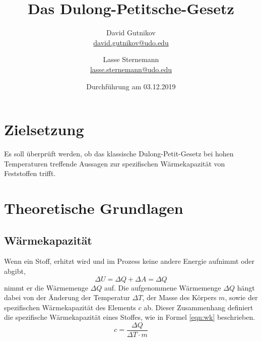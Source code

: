 \documentclass[titlepage = firstcover]{scrartcl}
\title{Das Dulong-Petitsche-Gesetz}
\author{
  David Gutnikov\\
  \href{mailto:david.gutnikov@udo.edu}{david.gutnikov@udo.edu}
 \and 
  Lasse Sternemann\\
  \href{mailto:lasse.sternemann@udo.edu}{lasse.sternemann@udo.edu}
}
\date{Durchführung am 03.12.2019}
\begin{document}
    \maketitle
    \tableofcontents
    \newpage

    \section{Zielsetzung}
        Es soll überprüft werden, ob das klassische Dulong-Petit-Gesetz bei hohen Temperaturen treffende Aussagen zur spezifischen
        Wärmekapazität von Feststoffen trifft.



    \section{Theoretische Grundlagen}
        \subsection{Wärmekapazität}
            Wenn ein Stoff, erhitzt wird und im Prozess keine andere Energie aufnimmt oder abgibt,
            \begin{equation*}
                \Delta U = \Delta Q + \Delta A = \Delta Q
            \end{equation*}
            nimmt er die Wärmemenge $\Delta Q$ auf. 
            Die aufgenommene Wärmemenge $\Delta Q$ hängt dabei von der Änderung der Temperatur $\Delta T$,
            der Masse des Körpers $m$, sowie der spezifischen Wärmekapazität des Elements $c$ ab. Dieser Zusammenhang definiert die spezifische
            Wärmekapazität eines Stoffes, wie in Formel \eqref{eqn:wk} beschrieben.  
            \begin{equation}
                c = \frac{\Delta Q}{\Delta T \cdot m }
                \label{eqn:wk}
            \end{equation}
        
\end{document}
